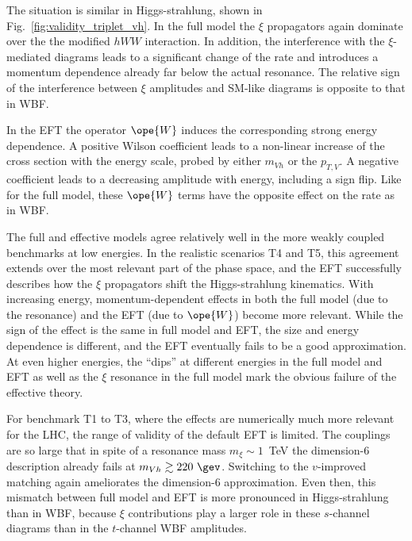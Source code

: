 The situation is similar in Higgs-strahlung, shown in
Fig.~\ref{fig:validity_triplet_vh}.  In the full model the $\xi$ propagators
again dominate over the the modified $hWW$ interaction.  In addition,
the interference with the $\xi$-mediated diagrams leads to a
significant change of the rate and introduces a momentum dependence
already far below the actual resonance.  The relative sign of the
interference between $\xi$ amplitudes and SM-like diagrams is opposite
to that in WBF.

In the EFT the operator $\ope{W}$ induces the corresponding strong
energy dependence.  A positive Wilson coefficient leads to a
non-linear increase of the cross section with the energy scale, probed
by either $m_{Vh}$ or the $p_{T,V}$. A negative coefficient leads to a
decreasing amplitude with energy, including a sign flip. Like for the
full model, these $\ope{W}$ terms have the opposite effect on the rate
as in WBF.

The full and effective models agree relatively well in the more weakly
coupled benchmarks at low energies. In the realistic scenarios T4 and
T5, this agreement extends over the most relevant part of the phase
space, and the EFT successfully describes how the $\xi$ propagators
shift the Higgs-strahlung kinematics. With increasing energy,
momentum-dependent effects in both the full model (due to the
resonance) and the EFT (due to $\ope{W}$) become more relevant. While
the sign of the effect is the same in full model and EFT, the size and
energy dependence is different, and the EFT eventually fails to be a
good approximation. At even higher energies, the ``dips'' at different
energies in the full model and EFT as well as the $\xi$ resonance in
the full model mark the obvious failure of the effective theory.

For benchmark T1 to T3, where the effects are numerically much more
relevant for the LHC, the range of validity of the default EFT is
limited. The couplings are so large that in spite of a resonance mass
$m_\xi \sim 1$~TeV the dimension-6 description already fails at
$m_{Vh} \gtrsim 220~\gev$.  Switching to the $v$-improved matching
again ameliorates the dimension-6 approximation.  Even then, this
mismatch between full model and EFT is more pronounced in
Higgs-strahlung than in WBF, because $\xi$ contributions play a larger
role in these $s$-channel diagrams than in the $t$-channel WBF
amplitudes. \medskip

